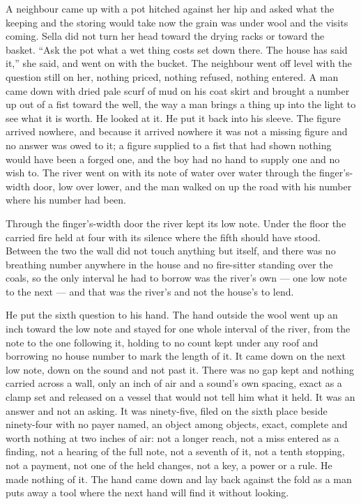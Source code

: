 A neighbour came up with a pot hitched against her hip and asked what the keeping and the storing would take now the grain was under wool and the visits coming. Sella did not turn her head toward the drying racks or toward the basket. “Ask the pot what a wet thing costs set down there. The house has said it,” she said, and went on with the bucket. The neighbour went off level with the question still on her, nothing priced, nothing refused, nothing entered. A man came down  with dried pale scurf of mud on his coat skirt and brought a number up out of a fist toward the well, the way a man brings a thing up into the light to see what it is worth. He looked at it. He put it back into his sleeve. The figure arrived nowhere, and because it arrived nowhere it was not a missing figure and no answer was owed to it; a figure supplied to a fist that had shown nothing would have been a forged one, and the boy had no hand to supply one and no wish to. The river went on with its note of water over water through the finger's-width door, low over lower, and the man walked on up the road with his number where his number had been.

\scenebreak

Through the finger's-width door the river kept its low note. Under the floor the carried fire held at four with its silence where the fifth should have stood. Between the two the wall did not touch anything but itself, and there was no breathing number anywhere in the house and no fire-sitter standing over the coals, so the only interval he had to borrow was the river's own --- one low note to the next --- and that was the river's and not the house's to lend.

He put the sixth question to his hand. The hand outside the wool went up an inch toward the low note and stayed for one whole interval of the river, from the note to the one following it, holding to no count kept under any roof and borrowing no house number to mark the length of it. It came down on the next low note, down on the sound and not past it. There was no gap kept and nothing carried across a wall, only an inch of air and a sound's own spacing, exact as a clamp set and released on a vessel that would not tell him what it held. It was an answer and not an asking. It was ninety-five, filed on the sixth place beside ninety-four with no payer named, an object among objects, exact, complete and worth nothing at two inches of air: not a longer reach, not a miss entered as a finding, not a hearing of the full note, not a seventh of it, not a tenth stopping, not a payment, not one of the held changes, not a key, a power or a rule. He made nothing of it. The hand came down and lay back against the fold as a man puts away a tool where the next hand will find it without looking.


